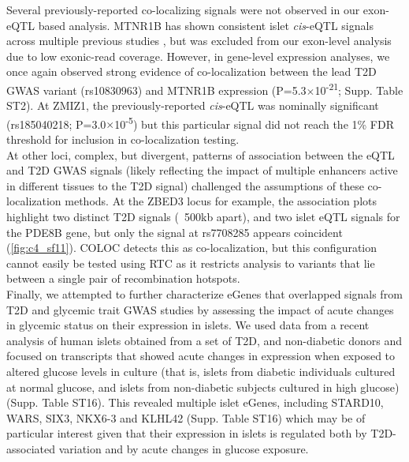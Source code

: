 Several previously-reported co-localizing signals were not observed in our exon-eQTL based analysis. MTNR1B has shown consistent islet \textit{cis}-eQTL signals across multiple previous studies \cite{vandebuntTranscriptExpressionData2015, tuomiIncreasedMelatoninSignaling2016}, but was excluded from our exon-level analysis due to low exonic-read coverage. However, in gene-level expression analyses, we once again observed strong evidence of co-localization between the lead T2D GWAS variant (rs10830963) and MTNR1B expression (P=5.3$\times$10\textsuperscript{-21}; Supp. Table ST2). At ZMIZ1, the previously-reported \textit{cis}-eQTL was nominally significant (rs185040218; P=3.0$\times$10\textsuperscript{-5}) but this particular signal did not reach the 1\% FDR threshold for inclusion in co-localization testing. \\

At other loci, complex, but divergent, patterns of association between the eQTL and T2D GWAS signals (likely reflecting the impact of multiple enhancers active in different tissues to the T2D signal) challenged the assumptions of these co-localization methods. At the ZBED3 locus for example, the association plots highlight two distinct T2D signals (~500kb apart), and two islet eQTL signals for the PDE8B gene, but only the signal at rs7708285 appears coincident (\ref{fig:c4_sf11}). COLOC detects this as co-localization, but this configuration cannot easily be tested using RTC as it restricts analysis to variants that lie between a single pair of recombination hotspots. \\

Finally, we attempted to further characterize eGenes that overlapped signals from T2D and glycemic trait GWAS studies by assessing the impact of acute changes in glycemic status on their expression in islets. We used data from a recent analysis of human islets obtained from a set of T2D, and non-diabetic donors and focused on transcripts that showed acute changes in expression when exposed to altered glucose levels in culture (that is, islets from diabetic individuals cultured at normal glucose, and islets from non-diabetic subjects cultured in high glucose) \cite{ottosson-laaksoGlucoseinducedChangesGene2017} (Supp. Table ST16). This revealed multiple islet eGenes, including STARD10, WARS, SIX3, NKX6-3 and KLHL42 (Supp. Table ST16) which may be of particular interest given that their expression in islets is regulated both by T2D-associated variation and by acute changes in glucose exposure.


